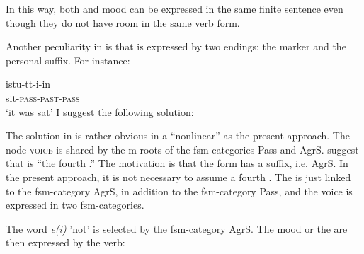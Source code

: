 \documentclass[output=paper]{langsci/langscibook}
\begin{document}
In this way, both  and mood can be expressed in the same finite sentence even though they do not have room in the same verb form. 

Another  peculiarity in  is that  is expressed by two endings: the  marker and the  personal suffix. For instance:


\ea%
    \label{ex:nikanne:18}
   \gll 	   istu-tt-i-in\\
      sit-\textsc{pass}-\textsc{past}-\textsc{pass}\\
\glt  ‘it was sat’
\z
\noindent I suggest the following solution:\largerpage

\ea%
\label{ex:nikanne:19}
\z 

The solution in  is rather obvious in a “nonlinear”  as the present approach. The node \textsc{voice} is shared by the m-roots of the fsm-categories Pass and AgrS.  \citet{HakulinenKarlsson1979} suggest that  is “the fourth .” The motivation is that the  form has a  suffix, i.e. AgrS. In the present approach, it is not necessary to assume a fourth . The  is just linked to the fsm-category AgrS, in addition to the fsm-category Pass, and the  voice is expressed in two fsm-categories.

The  word \textit{e(i)} 'not' is selected by the fsm-category AgrS. The mood or the  are then expressed by the verb:\largerpage[3]
\end{document}
